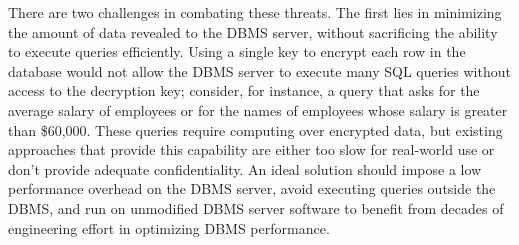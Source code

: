 



There are two challenges in combating these threats.  The first lies
in minimizing the amount of data revealed to the DBMS server, without
sacrificing the ability to execute queries efficiently.  Using
a single key to encrypt each row in the database would not allow the
DBMS server to execute many SQL queries without access to the
decryption key; consider, for instance, a query that asks for the
average salary of employees or for the names of employees whose salary
is greater than \$60,000.  These queries require computing over
encrypted data, but existing approaches that provide this capability
are either too slow for real-world use or don't provide adequate
confidentiality.  An ideal solution should impose a low performance
overhead on the DBMS server, avoid executing queries outside the DBMS,
and run on unmodified DBMS server software to benefit from decades of
engineering effort in optimizing DBMS performance.

